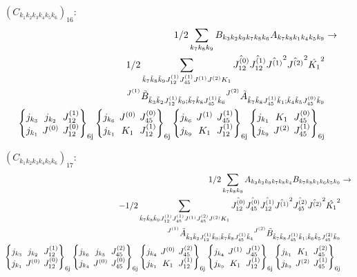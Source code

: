 \documentclass[11pt]{article}
\newcommand{\sixj}[6]{\begingroup\setlength{\arraycolsep}{0.2em}\begin{Bmatrix} #1 & #2 & #3 \\ #4 & #5 & #6 \end{Bmatrix}_{\text{6j}}\endgroup}
\begin{document}
$\left({C}_{{k}_{1}{k}_{2}{k}_{3}{k}_{4}{k}_{5}{k}_{6}}\right)_{16}$:
\begin{align}
1/2\sum_{{k}_{7}{k}_{8}{k}_{9}}{B}_{{k}_{3}{k}_{2}{k}_{9}{k}_{7}{k}_{8}{k}_{6}}{A}_{{k}_{7}{k}_{8}{k}_{1}{k}_{4}{k}_{5}{k}_{9}}&\rightarrow \notag \\1/2\sum_{\tilde{k}_{7}\tilde{k}_{8}\tilde{k}_{9}J^{(1)}_{12}J^{(1)}_{45}J^{(1)}J^{(2)}K_{1}}\hat{J^{(0)}_{12}}\hat{J^{(1)}_{12}}\hat{J^{(1)}}^{2}\hat{J^{(2)}}^{2}\hat{K_{1}}^{2}& \notag \\{}^{J^{(1)}}\tilde{B}_{\tilde{k}_{3}\tilde{k}_{2}J^{(1)}_{12}\tilde{k}_{9};\tilde{k}_{7}\tilde{k}_{8}J^{(1)}_{45}\tilde{k}_{6}}{}^{J^{(2)}}\tilde{A}_{\tilde{k}_{7}\tilde{k}_{8}J^{(1)}_{45}\tilde{k}_{1};\tilde{k}_{4}\tilde{k}_{5}J^{(0)}_{45}\tilde{k}_{9}}& \notag \\\sixj{j_{{k}_{3}}}{j_{{k}_{2}}}{J^{(1)}_{12}}{j_{{k}_{1}}}{J^{(0)}}{J^{(0)}_{12}}\sixj{j_{{k}_{6}}}{J^{(0)}}{J^{(0)}_{45}}{j_{{k}_{1}}}{K_{1}}{J^{(1)}_{12}}\sixj{j_{{k}_{6}}}{J^{(1)}}{J^{(1)}_{45}}{j_{{k}_{9}}}{K_{1}}{J^{(1)}_{12}}\sixj{j_{{k}_{1}}}{K_{1}}{J^{(0)}_{45}}{j_{{k}_{9}}}{J^{(2)}}{J^{(1)}_{45}}
\end{align}

$\left({C}_{{k}_{1}{k}_{2}{k}_{3}{k}_{4}{k}_{5}{k}_{6}}\right)_{17}$:
\begin{align}
1/2\sum_{{k}_{7}{k}_{8}{k}_{9}}{A}_{{k}_{3}{k}_{2}{k}_{9}{k}_{7}{k}_{8}{k}_{4}}{B}_{{k}_{7}{k}_{8}{k}_{1}{k}_{6}{k}_{5}{k}_{9}}&\rightarrow \notag \\-1/2\sum_{\tilde{k}_{7}\tilde{k}_{8}\tilde{k}_{9}J^{(1)}_{12}J^{(1)}_{45}J^{(1)}J^{(2)}_{45}J^{(2)}K_{1}}\hat{J^{(0)}_{12}}\hat{J^{(0)}_{45}}\hat{J^{(1)}_{12}}\hat{J^{(1)}}^{2}\hat{J^{(2)}_{45}}\hat{J^{(2)}}^{2}\hat{K_{1}}^{2}& \notag \\{}^{J^{(1)}}\tilde{A}_{\tilde{k}_{3}\tilde{k}_{2}J^{(1)}_{12}\tilde{k}_{9};\tilde{k}_{7}\tilde{k}_{8}J^{(1)}_{45}\tilde{k}_{4}}{}^{J^{(2)}}\tilde{B}_{\tilde{k}_{7}\tilde{k}_{8}J^{(1)}_{45}\tilde{k}_{1};\tilde{k}_{6}\tilde{k}_{5}J^{(2)}_{45}\tilde{k}_{9}}& \notag \\\sixj{j_{{k}_{3}}}{j_{{k}_{2}}}{J^{(1)}_{12}}{j_{{k}_{1}}}{J^{(0)}}{J^{(0)}_{12}}\sixj{j_{{k}_{6}}}{j_{{k}_{5}}}{J^{(2)}_{45}}{j_{{k}_{4}}}{J^{(0)}}{J^{(0)}_{45}}\sixj{j_{{k}_{4}}}{J^{(0)}}{J^{(2)}_{45}}{j_{{k}_{1}}}{K_{1}}{J^{(1)}_{12}}\sixj{j_{{k}_{4}}}{J^{(1)}}{J^{(1)}_{45}}{j_{{k}_{9}}}{K_{1}}{J^{(1)}_{12}}\sixj{j_{{k}_{1}}}{K_{1}}{J^{(2)}_{45}}{j_{{k}_{9}}}{J^{(2)}}{J^{(1)}_{45}}
\end{align}
\end{document}
